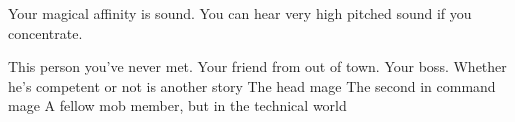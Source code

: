 \documentclass[char]{guildcamp3}
\begin{document}
\begin{itemz}[Notes]
	\item Your magical affinity is sound. You can hear very high pitched sound if you concentrate.
\end{itemz}

\begin{contacts}
  \contact{\cNPC{}} This person you've never met.
  \contact{\cSomeGuy{}} Your friend from out of town.
  \contact{\cNobleOne{}} Your boss. Whether he's competent or not is another story
  \contact{\cMageOne{}} The head mage
  \contact{\cMageTwo{}} The second in command mage
  \contact{\cSciOne{}} A fellow mob member, but in the technical world
\end{contacts}
\end{document}
